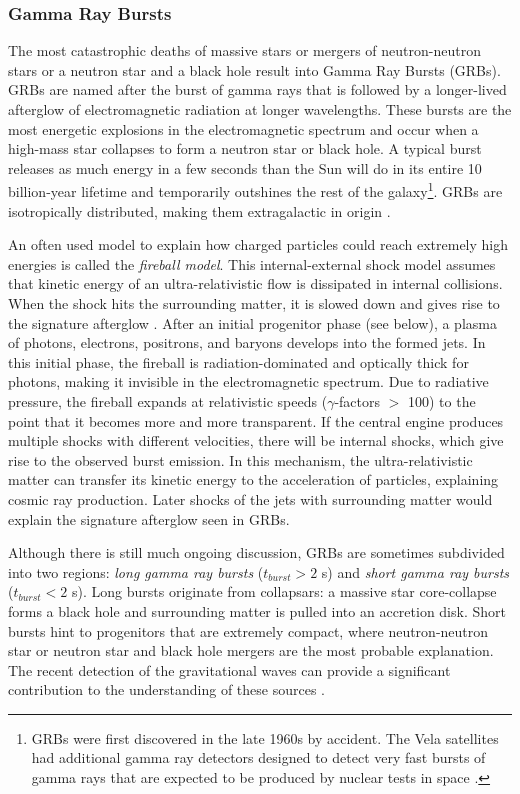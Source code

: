 \subsubsection{Gamma Ray Bursts}
\label{subsubsec:grb}
The most catastrophic deaths of massive stars or mergers of neutron-neutron stars or a neutron star and a black hole result into Gamma Ray Bursts (GRBs). GRBs are named after the burst of gamma rays that is followed by a longer-lived afterglow of electromagnetic radiation at longer wavelengths. These bursts are the most energetic explosions in the electromagnetic spectrum and occur when a high-mass star collapses to form a neutron star or black hole. A typical burst releases as much energy in a few seconds than the Sun will do in its entire 10 billion-year lifetime and temporarily outshines the rest of the galaxy\footnote{GRBs were first discovered in the late 1960s by accident. The Vela satellites had additional gamma ray detectors designed to detect very fast bursts of gamma rays that are expected to be produced by nuclear tests in space \cite{Klebesadel:1973iq}.}. GRBs are isotropically distributed, making them extragalactic in origin \cite{Meegan:1992xg}.

An often used model to explain how charged particles could reach extremely high energies is called the \textit{fireball model}. This internal-external shock model assumes that kinetic energy of an ultra-relativistic flow is dissipated in internal collisions. When the shock hits the surrounding matter, it is slowed down and gives rise to the signature afterglow \cite{Piran:2004ba}. After an initial progenitor phase (see below), a plasma of photons, electrons, positrons, and baryons develops into the formed jets. In this initial phase, the fireball is radiation-dominated and optically thick for photons, making it invisible in the electromagnetic spectrum. Due to radiative pressure, the fireball expands at relativistic speeds ($\gamma$-factors $>$ 100) to the point that it becomes more and more transparent. If the central engine produces multiple shocks with different velocities, there will be internal shocks, which give rise to the observed burst emission. In this mechanism, the ultra-relativistic matter can transfer its kinetic energy to the acceleration of particles, explaining cosmic ray production. Later shocks of the jets with surrounding matter would explain the signature afterglow seen in GRBs.

Although there is still much ongoing discussion, GRBs are sometimes subdivided into two regions: \textit{long gamma ray bursts} ($t_{burst} > 2$ s) and \textit{short gamma ray bursts} ($t_{burst} < 2$ s). Long bursts originate from collapsars: a massive star core-collapse forms a black hole and surrounding matter is pulled into an accretion disk. Short bursts hint to progenitors that are extremely compact, where neutron-neutron star or neutron star and black hole mergers are the most probable explanation. The recent detection of the gravitational waves can provide a significant contribution to the understanding of these sources \cite{TheLIGOScientific:2017qsa,Abbott:2017oio,Abbott:2017gyy,Abbott:2017vtc,Abbott:2016nmj}.

